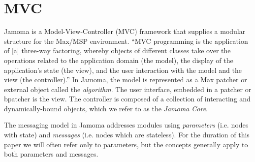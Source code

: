 \documentclass{article}
\begin{document}

% 




\section{MVC} %

Jamoma is a Model-View-Controller (MVC) framework that supplies a modular structure for the Max/MSP environment. ``MVC programming is the application of [a] three-way factoring, whereby objects of different classes take over the operations related to the application domain (the model), the display of the application's state (the view), and the user interaction with the model and the view (the controller).'' \cite{Krasner:1988}  In Jamoma, the model is represented as a Max patcher or external object called the \emph{algorithm}.  The user interface, embedded in a patcher or bpatcher is the view.  The controller is composed of a collection of interacting and dynamically-bound objects, which we refer to as the \emph{Jamoma Core}.


The messaging model in Jamoma addresses modules using \emph{parameters} (i.e. nodes with state) and \emph{messages} (i.e. nodes which are stateless). For the duration of this paper we will often refer only to parameters, but the concepts generally apply to both parameters and messages.
\end{document}
